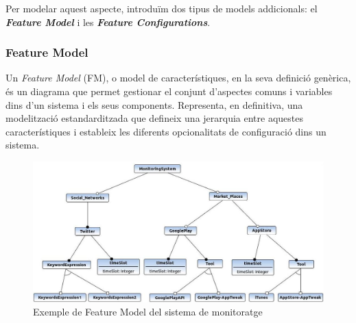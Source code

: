 Per modelar aquest aspecte, introduïm dos tipus de models addicionals: el \textbf{\textit{Feature Model}} i les \textbf{\textit{Feature Configurations}}.

\subsubsection{Feature Model}

Un \textit{Feature Model} (FM), o model de característiques, en la seva definició genèrica, és un diagrama que permet gestionar el conjunt d'aspectes comuns i variables dins d'un sistema i els seus components. Representa, en definitiva, una modelització estandarditzada que defineix una jerarquia entre aquestes característiques i estableix les diferents opcionalitats de configuració dins un sistema.\\

\begin{figure}
\centering
\includegraphics[width=14cm]{Figures/Figure17}
\decoRule
\caption{Exemple de Feature Model del sistema de monitoratge}
\label{fig:Figura17}
\end{figure}

